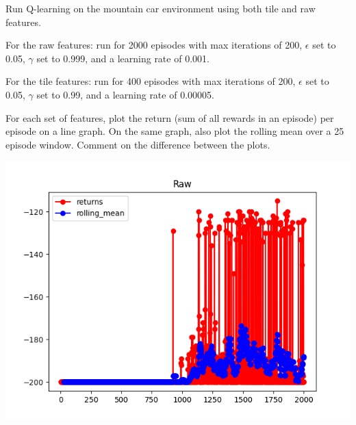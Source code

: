 \documentclass[11pt,addpoints,answers]{exam}
\begin{document}
\begin{questions}
    \question[4] Run Q-learning on the mountain car environment using both tile and raw features. 
    
    For the raw features: run for 2000 episodes with max iterations of 200, $\epsilon$ set to 0.05, $\gamma$ set to 0.999, and a learning rate of 0.001. 
    
    For the tile features: run for 400 episodes with max iterations of 200, $\epsilon$ set to 0.05, $\gamma$ set to 0.99, and a learning rate of 0.00005.
    
    For each set of features, plot the return (sum of all rewards in an episode) per episode on a line graph. On the same graph, also plot the rolling mean over a 25 episode window. Comment on the difference between the plots.
    
    \begin{your_solution}[title=Plot of Raw, height=10cm,width=15cm]
        \begin{center}
           \includegraphics[scale=0.7]{plots/raw.png}
        \end{center}
    \end{your_solution}
    

\end{questions}
\end{document}
